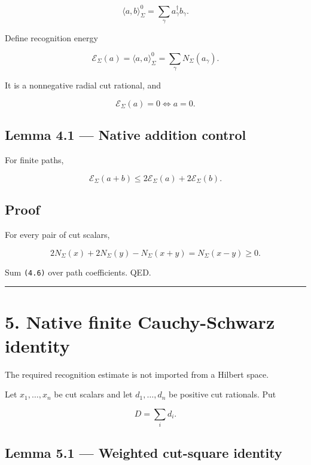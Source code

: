 \[
\boxed{
\langle a,b\rangle_\Sigma^0
=
\sum_\gamma a_\gamma^\dagger b_\gamma.
}
\tag{4.2}
\]

Define recognition energy

\[
\boxed{
\mathcal E_\Sigma(a)
=
\langle a,a\rangle_\Sigma^0
=
\sum_\gamma N_\Sigma(a_\gamma).
}
\tag{4.3}
\]

It is a nonnegative radial cut rational, and

\[
\mathcal E_\Sigma(a)=0
\Longleftrightarrow
a=0.
\tag{4.4}
\]

\hypertarget{lemma-4.1-native-addition-control}{%
\subsection{Lemma 4.1 --- Native addition control}\label{lemma-4.1-native-addition-control}}

For finite paths,

\[
\boxed{
\mathcal E_\Sigma(a+b)
\le
2\mathcal E_\Sigma(a)+2\mathcal E_\Sigma(b).
}
\tag{4.5}
\]

\hypertarget{proof-4}{%
\subsection{Proof}\label{proof-4}}

For every pair of cut scalars,

\[
2N_\Sigma(x)+2N_\Sigma(y)-N_\Sigma(x+y)
=N_\Sigma(x-y)\ge0.
\tag{4.6}
\]

Sum \texttt{(4.6)} over path coefficients. QED.

\begin{center}\rule{0.5\linewidth}{0.5pt}\end{center}

\hypertarget{native-finite-cauchy-schwarz-identity}{%
\section{5. Native finite Cauchy-Schwarz identity}\label{native-finite-cauchy-schwarz-identity}}

The required recognition estimate is not imported from a Hilbert space.

Let \(x_1,\ldots,x_n\) be cut scalars and let
\(d_1,\ldots,d_n\) be positive cut rationals. Put

\[
D=\sum_i d_i.
\]

\hypertarget{lemma-5.1-weighted-cut-square-identity}{%
\subsection{Lemma 5.1 --- Weighted cut-square identity}\label{lemma-5.1-weighted-cut-square-identity}}

